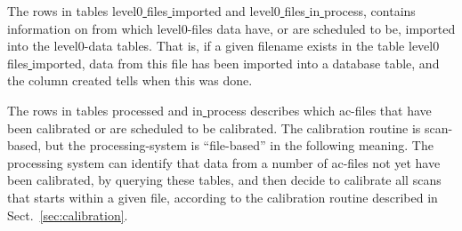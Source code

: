 \documentclass[12pt]{article}
\begin{document}
The rows in tables level0\underline{ }files\underline{ }imported and  
level0\underline{ }files\underline{ }in\underline{ }process,
contains information on from which level0-files data have,
or are scheduled to be, imported into the level0-data tables.
That is, if a given filename exists in the table 
level0\underline{ }files\underline{ }imported, data from
this file has been imported into a database table, and 
the column created tells when this was done. 
 
The rows in tables processed and in\underline{ }process 
describes which ac-files that have been calibrated
or are scheduled to be calibrated.
The calibration routine is scan-based, but the processing-system
is ``file-based'' in the following meaning. 
The processing system can identify that data
from a number of ac-files not yet have been calibrated,
by querying these tables, and then decide
to calibrate all scans that starts within a given file,
according to the calibration routine described in Sect.~\ref{sec:calibration}.
\end{document}

